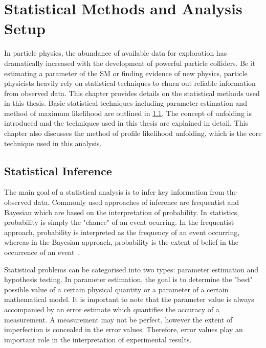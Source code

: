 
\chapter{Statistical Methods and Analysis Setup}


In particle physics, the abundance of available data for exploration has dramatically increased with the development of 
powerful particle colliders. Be it estimating a parameter of the SM or finding
evidence of new physics, particle physicists heavily rely on statistical techniques to churn
out reliable information from observed data. This chapter provides details on the statistical methods
used in this thesis. Basic statistical techniques including parameter 
estimation and method of maximum likelihood are outlined in \cref{sec:statinfer}.
The concept of unfolding is introduced and the techniques used in this thesis are explained in
detail. This chapter also discusses the method of profile likelihood 
unfolding, which is the core technique used in this analysis.

\section{Statistical Inference}
\label{sec:statinfer}
The main goal of a statistical analysis is to infer key information from the observed data.
Commonly used approaches of inference are frequentist and Bayesian which are based on the
interpretation of probability. In statistics, probability is simply the "chance" of an event ocurring.
In the frequentist approach, probability is interpreted as the 
frequency of an event occurring, whereas in the Bayesian approach, probability is the extent of 
belief in the occurrence of an event~\cite{2015arXiv150400945P}. 

Statistical problems can be categorised into two types: parameter estimation and hypothesis 
testing. In parameter estimation, the goal is to determine the "best" possible value of a certain
physical quantity or a parameter of a certain mathematical model. It is important to note that 
the parameter value is always accompanied by an error estimate which quantifies the accuracy of 
a measurement. A measurement may not be perfect, however the extent of imperfection is 
concealed in the error values. Therefore, error values play an important role in the interpretation of 
experimental results.


